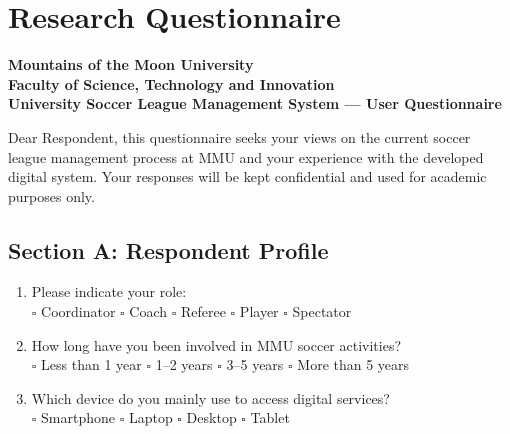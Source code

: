 \documentclass[12pt,a4paper]{report}
\begin{document}
\chapter{Research Questionnaire}

\begin{center}
\textbf{Mountains of the Moon University}\\
\textbf{Faculty of Science, Technology and Innovation}\\[0.3cm]
\textbf{University Soccer League Management System --- User Questionnaire}
\end{center}

\noindent Dear Respondent, this questionnaire seeks your views on the current soccer league
management process at MMU and your experience with the developed digital system. Your responses
will be kept confidential and used for academic purposes only.

\section*{Section A: Respondent Profile}
\begin{enumerate}
  \item Please indicate your role:\\
    $\square$ Coordinator \quad $\square$ Coach \quad $\square$ Referee \quad $\square$ Player \quad $\square$ Spectator

  \item How long have you been involved in MMU soccer activities?\\
    $\square$ Less than 1 year \quad $\square$ 1--2 years \quad $\square$ 3--5 years \quad $\square$ More than 5 years

  \item Which device do you mainly use to access digital services?\\
    $\square$ Smartphone \quad $\square$ Laptop \quad $\square$ Desktop \quad $\square$ Tablet
\end{enumerate}
\end{document}
